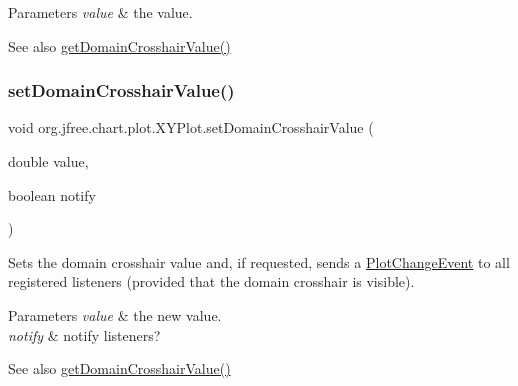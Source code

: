 \begin{DoxyParams}{Parameters}
{\em value} & the value.\\
\hline
\end{DoxyParams}
\begin{DoxySeeAlso}{See also}
\mbox{\hyperlink{classorg_1_1jfree_1_1chart_1_1plot_1_1_x_y_plot_af89d596c34f4964a58156a7e83728536}{get\+Domain\+Crosshair\+Value()}} 
\end{DoxySeeAlso}
\mbox{\label{classorg_1_1jfree_1_1chart_1_1plot_1_1_x_y_plot_a474a9b26745c993fd9b3929a42a0277c}} 
\subsubsection{\texorpdfstring{set\+Domain\+Crosshair\+Value()}{setDomainCrosshairValue()}\hspace{0.1cm}{\footnotesize\ttfamily [2/2]}}
{\footnotesize\ttfamily void org.\+jfree.\+chart.\+plot.\+X\+Y\+Plot.\+set\+Domain\+Crosshair\+Value (\begin{DoxyParamCaption}\item[{double}]{value,  }\item[{boolean}]{notify }\end{DoxyParamCaption})}

Sets the domain crosshair value and, if requested, sends a \mbox{\hyperlink{}{Plot\+Change\+Event}} to all registered listeners (provided that the domain crosshair is visible).


\begin{DoxyParams}{Parameters}
{\em value} & the new value. \\
\hline
{\em notify} & notify listeners?\\
\hline
\end{DoxyParams}
\begin{DoxySeeAlso}{See also}
\mbox{\hyperlink{classorg_1_1jfree_1_1chart_1_1plot_1_1_x_y_plot_af89d596c34f4964a58156a7e83728536}{get\+Domain\+Crosshair\+Value()}} 
\end{DoxySeeAlso}
\mbox{\label{classorg_1_1jfree_1_1chart_1_1plot_1_1_x_y_plot_afccb957d4967c1b414c051328124efcb}} 
